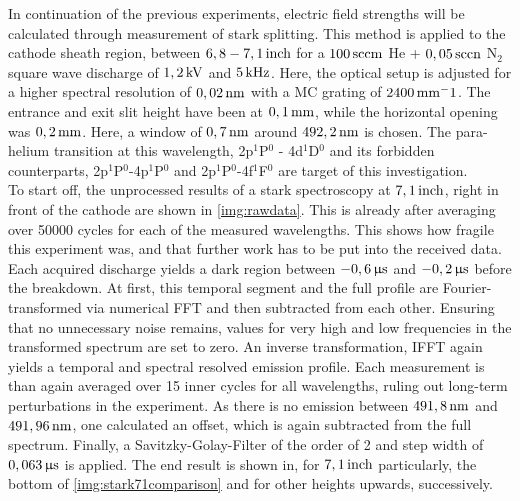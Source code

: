 \documentclass[a4paper,10pt,twoside]{article}
\begin{document}
		In continuation of the previous experiments, electric field strengths will be calculated through measurement of stark splitting. This method is applied to the cathode sheath region, between $\unit[6,8-7,1]{inch}$ for a $\unit[100]{sccm}$ He + $\unit[0,05]{sccn}$ N$_2$ square wave discharge of $\unit[1,2]{kV}$ and $\unit[5]{kHz}$. Here, the optical setup is adjusted for a higher spectral resolution of $\unit[0,02]{nm}$ with a MC grating of $\unit[2400]{mm^-1}$. The entrance and exit slit height have been at $\unit[0,1]{mm}$, while the horizontal opening was $\unit[0,2]{mm}$. Here, a window of $\unit[0,7]{nm}$ around $\unit[492,2]{nm}$ is chosen. The para-helium transition at this wavelength, 2p$^1$P$^0$ - 4d$^1$D$^0$ and its forbidden counterparts, 2p$^1$P$^0$-4p$^1$P$^0$ and 2p$^1$P$^0$-4f$^1$F$^0$ are target of this investigation.\\
		To start off, the unprocessed results of a stark spectroscopy at $\unit[7,1]{inch}$, right in front of the cathode are shown in \autoref{img:rawdata}. This is already after averaging over 50000 cycles for each of the measured wavelengths. This shows how fragile this experiment was, and that further work has to be put into the received data.\\
		Each acquired discharge yields a dark region between $\unit[-0,6]{\upmu s}$ and $\unit[-0,2]{\upmu s}$ before the breakdown. At first, this temporal segment and the full profile are Fourier-transformed via numerical FFT and then subtracted from each other. Ensuring that no unnecessary noise remains, values for very high and low frequencies in the transformed spectrum are set to zero. An inverse transformation, IFFT again yields a temporal and spectral resolved emission profile. Each measurement is than again averaged over 15 inner cycles for all wavelengths, ruling out long-term perturbations in the experiment. As there is no emission between $\unit[491,8]{nm}$ and $\unit[491,96]{nm}$, one calculated an offset, which is again subtracted from the full spectrum. Finally, a Savitzky-Golay-Filter of the order of 2 and step width of $\unit[0,063]{\upmu s}$ is applied. The end result is shown in, for $\unit[7,1]{inch}$ particularly, the bottom of \autoref{img:stark71comparison} and for other heights upwards, successively.\\
\end{document}

